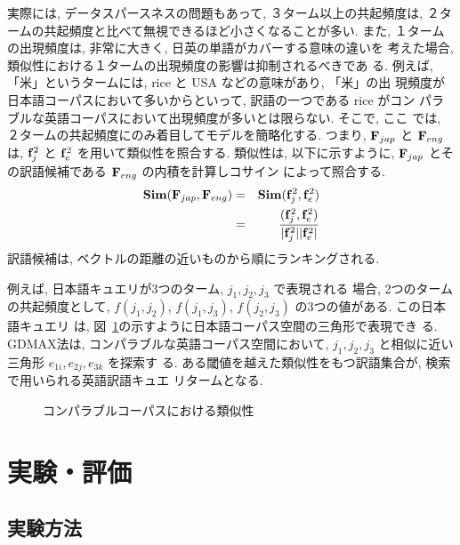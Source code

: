 実際には, データスパースネスの問題もあって, ３ターム以上の共起頻度は, 
２タームの共起頻度と比べて無視できるほど小さくなることが多い. また, 
１タームの出現頻度は, 非常に大きく, 日英の単語がカバーする意味の違いを
考えた場合, 類似性における１タームの出現頻度の影響は抑制されるべきであ
る. 例えば, 「米」というタームには, rice と USA などの意味があり, 「米」の出
現頻度が日本語コーパスにおいて多いからといって, 訳語の一つである rice がコン
パラブルな英語コーパスにおいて出現頻度が多いとは限らない. そこで, ここ
では, ２タームの共起頻度にのみ着目してモデルを簡略化する. つまり, 
${\bf F}_{jap}$ と ${\bf F}_{eng}$ は, ${\bf f}_{j}^{2}$ と ${\bf
f}_{e}^{2}$ を用いて類似性を照合する. 類似性は, 以下に示すように, 
 ${\bf F}_{jap}$ とその訳語候補である ${\bf F}_{eng}$ の内積を計算しコサイン
によって照合する. 
\vspace{-4mm}
\begin{eqnarray*}
{\bf Sim}({\bf F}_{jap},{\bf F}_{eng}) & = & {\bf Sim}({\bf f}_{j}^{2},{\bf f}_{e}^{2}) \\
 & = &
  \frac{({\bf f}_{j}^{2},{\bf f}_{e}^{2})}{|{\bf f}_{j}^{2}||{\bf f}_{e}^{2}|}
\end{eqnarray*}
訳語候補は, ベクトルの距離の近いものから順にランキングされる. 

例えば, 日本語キュエリが3つのターム, $j_{1},j_{2},j_{3}$ で表現される
場合, 2つのタームの共起頻度として,  $f(j_{1},j_{2})$,
$f(j_{1},j_{3})$, $f(j_{2},j_{3})$ の3つの値がある. この日本語キュエリ
は, 図~\ref{dmaxspace}の示すように日本語コーパス空間の三角形で表現でき
る. GDMAX法は, コンパラブルな英語コーパス空間において, 
$j_{1},j_{2},j_{3}$ と相似に近い三角形 $e_{1i},e_{2j},e_{3k}$ を探索す
る. ある閾値を越えた類似性をもつ訳語集合が, 検索で用いられる英語訳語キュエ
リタームとなる. 

\begin{figure}[htbp]
      \begin{center}
      \end{center}
  \caption{コンパラブルコーパスにおける類似性}
  \label{dmaxspace}
\end{figure}

\section{実験・評価}

\subsection{実験方法}

